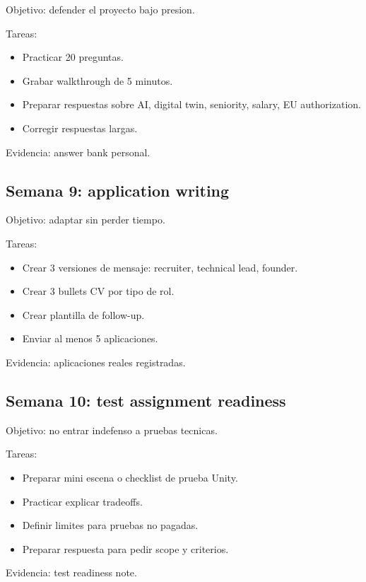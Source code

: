 Objetivo: defender el proyecto bajo presion.


Tareas:


\begin{itemize}
\item Practicar 20 preguntas.
\item Grabar walkthrough de 5 minutos.
\item Preparar respuestas sobre AI, digital twin, seniority, salary, EU authorization.
\item Corregir respuestas largas.
\end{itemize}


Evidencia: answer bank personal.


\subsection{Semana 9: application writing}


Objetivo: adaptar sin perder tiempo.


Tareas:


\begin{itemize}
\item Crear 3 versiones de mensaje: recruiter, technical lead, founder.
\item Crear 3 bullets CV por tipo de rol.
\item Crear plantilla de follow-up.
\item Enviar al menos 5 aplicaciones.
\end{itemize}


Evidencia: aplicaciones reales registradas.


\subsection{Semana 10: test assignment readiness}


Objetivo: no entrar indefenso a pruebas tecnicas.


Tareas:


\begin{itemize}
\item Preparar mini escena o checklist de prueba Unity.
\item Practicar explicar tradeoffs.
\item Definir limites para pruebas no pagadas.
\item Preparar respuesta para pedir scope y criterios.
\end{itemize}


Evidencia: test readiness note.


